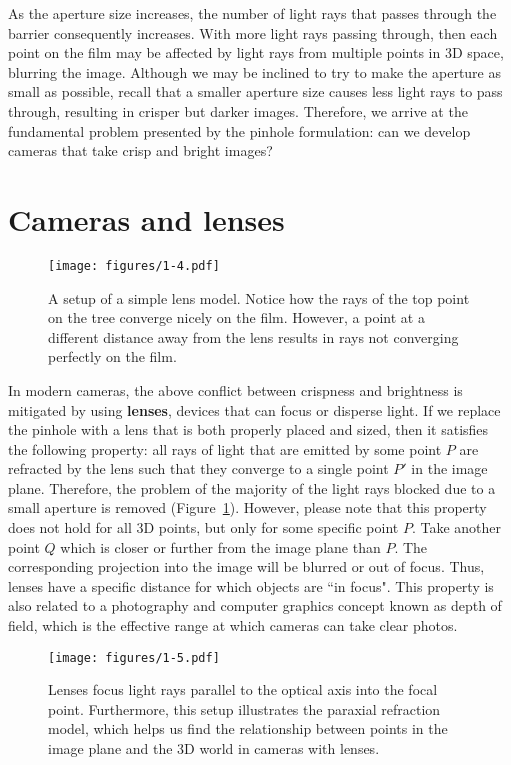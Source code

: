 \documentclass[a4paper, 12pt]{article}
\renewcommand\emph{\textbf}
\begin{document}
As the aperture size increases, the number of light rays that passes through the barrier consequently increases. With more light rays passing through, then each point on the film may be affected by light rays from multiple points in 3D space, blurring the image. Although we may be inclined to try to make the aperture as small as possible, recall that a smaller aperture size causes less light rays to pass through, resulting in crisper but darker images. Therefore, we arrive at the fundamental problem presented by the pinhole formulation: can we develop cameras that take crisp and bright images?

\section{Cameras and lenses}
\begin{figure}[h!]
\centering
\texttt{[image: figures/1-4.pdf]}
\caption{A setup of a simple lens model. Notice how the rays of the top point on the tree converge nicely on the film. However, a point at a different distance away from the lens results in rays not converging perfectly on the film.}
\label{fig:lens}
\end{figure}

In modern cameras, the above conflict between crispness and brightness is mitigated by using \emph{lenses}, devices that can focus or disperse light. If we replace the pinhole with a lens that is both properly placed and sized, then it satisfies the following property: all rays of light that are emitted by some point $P$ are refracted by the lens such that they converge to a single point $P'$ in the image plane. Therefore, the problem of the majority of the light rays blocked due to a small aperture is removed (Figure~\ref{fig:lens}). However, please note that this property does not hold for all 3D points, but only for some specific point $P$. Take another point $Q$ which is closer or further from the image plane than $P$. The corresponding projection into the image will be blurred or out of focus. Thus, lenses have a specific distance for which objects are ``in focus". This property is also related to a photography and computer graphics concept known as depth of field, which is the effective range at which cameras can take clear photos.

\begin{figure}[h!]
\centering
\texttt{[image: figures/1-5.pdf]}
\caption{Lenses focus light rays parallel to the optical axis into the focal point. Furthermore, this setup illustrates the paraxial refraction model, which helps us find the relationship between points in the image plane and the 3D world in cameras with lenses.}
\label{fig:paraxial}
\end{figure}
\end{document}
